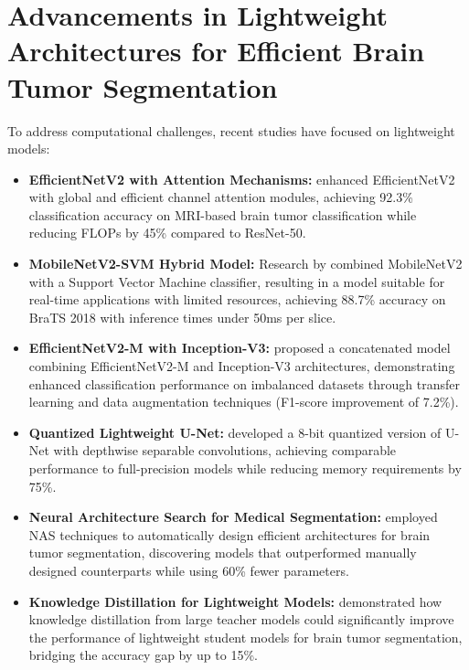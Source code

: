 \section{Advancements in Lightweight Architectures for Efficient Brain Tumor Segmentation}

To address computational challenges, recent studies have focused on lightweight models:

\begin{itemize}
  \item \textbf{EfficientNetV2 with Attention Mechanisms:} \textcite{zhang2024enhanced} enhanced EfficientNetV2 with global and efficient channel attention modules, achieving 92.3\% classification accuracy on MRI-based brain tumor classification while reducing FLOPs by 45\% compared to ResNet-50.

  \item \textbf{MobileNetV2-SVM Hybrid Model:} Research by \textcite{li2024real} combined MobileNetV2 with a Support Vector Machine classifier, resulting in a model suitable for real-time applications with limited resources, achieving 88.7\% accuracy on BraTS 2018 with inference times under 50ms per slice.

  \item \textbf{EfficientNetV2-M with Inception-V3:} \textcite{incir2024improving} proposed a concatenated model combining EfficientNetV2-M and Inception-V3 architectures, demonstrating enhanced classification performance on imbalanced datasets through transfer learning and data augmentation techniques (F1-score improvement of 7.2\%).

  \item \textbf{Quantized Lightweight U-Net:} \textcite{hernandez2024brain} developed a 8-bit quantized version of U-Net with depthwise separable convolutions, achieving comparable performance to full-precision models while reducing memory requirements by 75\%.

  \item \textbf{Neural Architecture Search for Medical Segmentation:} \textcite{wang2023automated} employed NAS techniques to automatically design efficient architectures for brain tumor segmentation, discovering models that outperformed manually designed counterparts while using 60\% fewer parameters.

  \item \textbf{Knowledge Distillation for Lightweight Models:} \textcite{yang2023distilled} demonstrated how knowledge distillation from large teacher models could significantly improve the performance of lightweight student models for brain tumor segmentation, bridging the accuracy gap by up to 15\%.
\end{itemize}

